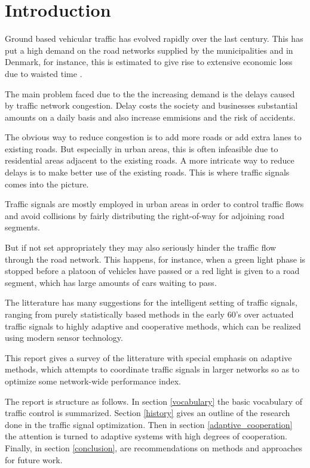 \section{Introduction}
Ground based vehicular traffic has evolved rapidly over the last century. This has put a high demand on the road networks supplied by the municipalities and in Denmark, for instance, this is estimated to give rise to extensive economic loss due to waisted time \cite{do2006kap3}. 

The main problem faced due to the the increasing demand is the delays caused by traffic network congestion. Delay costs the society and businesses substantial amounts on a daily basis and also increase emmisions and the risk of accidents.

The obvious way to reduce congestion is to add more roads or add extra lanes to existing roads. But especially in urban areas, this is often infeasible due to residential areas adjacent to the existing roads. 
A more intricate way to reduce delays is to make better use of the existing roads. This is where traffic signals comes into the picture. 

Traffic signals are mostly employed in urban areas in order to control traffic flows and avoid collisions by fairly distributing the right-of-way for adjoining road segments.

But if not set appropriately they may also seriously hinder the traffic flow through the road network. This happens, for instance, when a green light phase is stopped before a platoon of vehicles have passed or a red light is given to a road segment, which has large amounts of cars waiting to pass.

The litterature has many suggestions for the intelligent setting of traffic signals, ranging from purely statistically based methods in the early 60's over actuated traffic signals to highly adaptive and cooperative methods, which can be realized using modern sensor technology. 

This report gives a survey of the litterature with special emphasis on adaptive methods, which attempts to coordinate traffic signals in larger networks so as to optimize some network-wide performance index.

The report is structure as follows. In section \ref{vocabulary} the basic vocabulary of traffic control is summarized. Section \ref{history} gives an outline of the research done in the traffic signal optimization. Then in section \ref{adaptive_cooperation} the attention is turned to adaptive systems with high degrees of cooperation.
Finally, in section \ref{conclusion}, are recommendations on methods and approaches for future work.